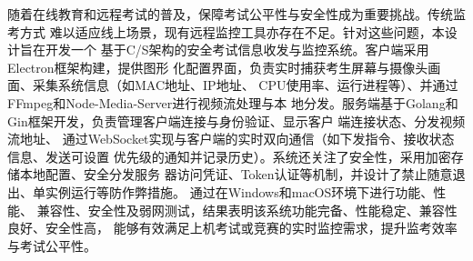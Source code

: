 
{}

\begin{abstractcn}
随着在线教育和远程考试的普及，保障考试公平性与安全性成为重要挑战。传统监考方式
难以适应线上场景，现有远程监控工具亦存在不足。针对这些问题，本设计旨在开发一个
基于C/S架构的安全考试信息收发与监控系统。客户端采用Electron框架构建，提供图形
化配置界面，负责实时捕获考生屏幕与摄像头画面、采集系统信息（如MAC地址、IP地址、
CPU使用率、运行进程等）、并通过FFmpeg和Node-Media-Server进行视频流处理与本
地分发。服务端基于Golang和Gin框架开发，负责管理客户端连接与身份验证、显示客户
端连接状态、分发视频流地址、
通过WebSocket实现与客户端的实时双向通信（如下发指令、接收状态信息、发送可设置
优先级的通知并记录历史）。系统还关注了安全性，采用加密存储本地配置、安全分发服务
器访问凭证、Token认证等机制，并设计了禁止随意退出、单实例运行等防作弊措施。
通过在Windows和macOS环境下进行功能、性能、
兼容性、安全性及弱网测试，结果表明该系统功能完备、性能稳定、兼容性良好、安全性高，
能够有效满足上机考试或竞赛的实时监控需求，提升监考效率与考试公平性。


\end{abstractcn}